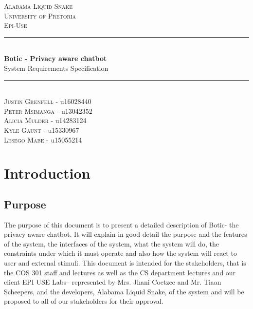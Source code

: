 \documentclass[11pt]{article}
\begin{document}
\renewcommand{\familydefault}{\sfdefault}
\begin{titlepage}
	\newcommand{\HRule}{\rule{\linewidth}{0.5mm}}
	\begin{center}
		            
		\textsc{\LARGE Alabama Liquid Snake}\\[0.8cm]
		\textsc{\Large University of Pretoria}\\[0.5cm]
		\textsc{\large Epi-Use}\\[0.5cm]
		    
		\HRule\\[0.4cm]
		    	
		{\huge\bfseries Botic - Privacy aware chatbot}\\[0.2cm]
		    	
		{\huge System Requirements Specification}\\[0.2cm]
		
		\HRule\\[0.5cm]
		
		\textsc{Justin Grenfell} - u16028440 \\[0cm]
		\textsc{Peter Msimanga} - u13042352 \\[0cm]
		\textsc{Alicia Mulder} - u14283124 \\[0cm]
		\textsc{Kyle Gaunt} - u15330967 \\[0cm]
		\textsc{Lesego Mabe} - u15055214 \\[0cm]
		    
	\end{center}
\end{titlepage}
\tableofcontents
\newpage
\section{Introduction}
\subsection{Purpose}
The purpose of this document is to present a detailed description of Botic- the privacy aware chatbot. It will explain in good detail the purpose and the features of the system, the interfaces of the system, what the system will do, the constraints under which it must operate and also how the system will react to user and external stimuli. This document is intended for the stakeholders, that is the COS 301 staff and lectures as well as the CS department lectures and our client EPI USE Labs-- represented by Mrs. Jhani Coetzee and Mr. Tiaan Scheepers, and the developers, Alabama Liquid Snake, of the system and will be proposed to all of our stakeholders for their approval.
\end{document}
